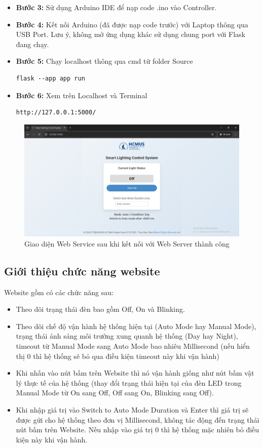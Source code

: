 {\begin{itemize}
    \item \textbf{Bước 3:} Sử dụng Arduino IDE để nạp code .ino vào Controller. 
    \item \textbf{Bước 4:} Kết nối Arduino (đã được nạp code trước) với Laptop thông qua USB Port. Lưu ý, không mở ứng dụng khác sử dụng chung port với Flask đang chạy. 
    \item \textbf{Bước 5:} Chạy localhost thông qua cmd từ folder Source
    \begin{lstlisting}
flask --app app run\end{lstlisting}
    \item \textbf{Bước 6:} Xem trên Localhost và Terminal
    \begin{lstlisting}
http://127.0.0.1:5000/\end{lstlisting}

\end{itemize}
\begin{figure}[!h]
    \centering
    \includegraphics[width=1\linewidth]{img/WebUXUI.png}
    \caption{Giao diện Web Service sau khi kết nối với Web Server thành công}
    \label{fig:enter-label}
\end{figure}

\pagebreak
\subsection{Giới thiệu chức năng website}
Website gồm có các chức năng sau: 
\begin{itemize}
    \item Theo dõi trạng thái đèn bao gồm Off, On và Blinking.
    \item Theo dõi chế độ vận hành hệ thống hiện tại (Auto Mode hay Manual Mode), trạng thái ánh sáng môi trường xung quanh hệ thống (Day hay Night), timeout từ Manual Mode sang Auto Mode bao nhiêu Millisecond (nếu hiển thị 0 thì hệ thống sẽ bỏ qua điều kiện timeout này khi vận hành)
    \item Khi nhấn vào nút bấm trên Website thì nó vận hành giống như nút bấm vật lý thực tế của hệ thống (thay đổi trạng thái hiện tại của đèn LED trong Manual Mode từ On sang Off, Off sang On, Blinking sang Off).
    \item Khi nhập giá trị vào Switch to Auto Mode Duration và Enter thì giá trị sẽ được gửi cho hệ thống theo đơn vị Millisecond, không tác động đến trạng thái nút bấm trên Website. Nếu nhập vào giá trị 0 thì hệ thống mặc nhiên bỏ điều kiện này khi vận hành.
\end{itemize}

}

